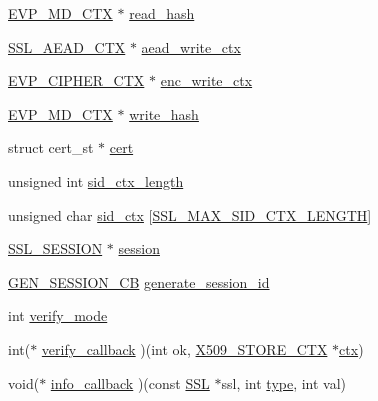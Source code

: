 \begin{DoxyCompactItemize}
\item 
\hyperlink{ossl__typ_8h_a69cda4d21bd068f01c469222c1dd92fe}{E\+V\+P\+\_\+\+M\+D\+\_\+\+C\+TX} $\ast$ \hyperlink{structssl__st_af550f07608665dad2b09a83c42ce494c}{read\+\_\+hash}
\item 
\hyperlink{ssl_8h_abe973b3da5b2abbf35e7db39ac109eeb}{S\+S\+L\+\_\+\+A\+E\+A\+D\+\_\+\+C\+TX} $\ast$ \hyperlink{structssl__st_ae080a53247c9d2a2318f39190d466063}{aead\+\_\+write\+\_\+ctx}
\item 
\hyperlink{ossl__typ_8h_aab2bd6a044e1d31ebc2fe82b3b0b3d9a}{E\+V\+P\+\_\+\+C\+I\+P\+H\+E\+R\+\_\+\+C\+TX} $\ast$ \hyperlink{structssl__st_a44444bb7794521afc2b9e52cd0c2570c}{enc\+\_\+write\+\_\+ctx}
\item 
\hyperlink{ossl__typ_8h_a69cda4d21bd068f01c469222c1dd92fe}{E\+V\+P\+\_\+\+M\+D\+\_\+\+C\+TX} $\ast$ \hyperlink{structssl__st_a491e1c0b9386b4003bb443af4a2d06d4}{write\+\_\+hash}
\item 
struct cert\+\_\+st $\ast$ \hyperlink{structssl__st_a335d212e807952601a0eabf4dfd978eb}{cert}
\item 
unsigned int \hyperlink{structssl__st_a7b63f375f11b5232a5dff69e26f6a438}{sid\+\_\+ctx\+\_\+length}
\item 
unsigned char \hyperlink{structssl__st_a486ddbf462473285440234c69568b9ce}{sid\+\_\+ctx} \mbox{[}\hyperlink{ssl_8h_a5cef804495c6414283f4f29d4cea0dd0}{S\+S\+L\+\_\+\+M\+A\+X\+\_\+\+S\+I\+D\+\_\+\+C\+T\+X\+\_\+\+L\+E\+N\+G\+TH}\mbox{]}
\item 
\hyperlink{ssl_8h_a8dd6b81bbcb1b2d769235c37779d2a94}{S\+S\+L\+\_\+\+S\+E\+S\+S\+I\+ON} $\ast$ \hyperlink{structssl__st_ae6d956c10b03dd3f4d0a3a132466eb47}{session}
\item 
\hyperlink{ssl_8h_a65a9d48d5b4f31797d3ce43e3ac7a8a1}{G\+E\+N\+\_\+\+S\+E\+S\+S\+I\+O\+N\+\_\+\+CB} \hyperlink{structssl__st_aa315242df1667bfb185bfcaa5b7ca86f}{generate\+\_\+session\+\_\+id}
\item 
int \hyperlink{structssl__st_a7592fd603fe469b789f13bdbc55a172e}{verify\+\_\+mode}
\item 
int($\ast$ \hyperlink{structssl__st_a5891d1f44fd1385ae1c1c4e866450133}{verify\+\_\+callback} )(int ok, \hyperlink{ossl__typ_8h_ae681945a2cf88d6337137dc0260a1545}{X509\+\_\+\+S\+T\+O\+R\+E\+\_\+\+C\+TX} $\ast$\hyperlink{structssl__st_a5a3ac76eff749d5d3c9ecf6b1a230497}{ctx})
\item 
void($\ast$ \hyperlink{structssl__st_aaf32f29b307cfa33c4a19a7cf11bc36f}{info\+\_\+callback} )(const \hyperlink{ossl__typ_8h_a71f21e09bf365489dab9d85bd4785e24}{S\+SL} $\ast$ssl, int \hyperlink{structssl__st_a5d2a229f22c169bd5eecefd9f017e089}{type}, int val)

\end{DoxyCompactItemize}
